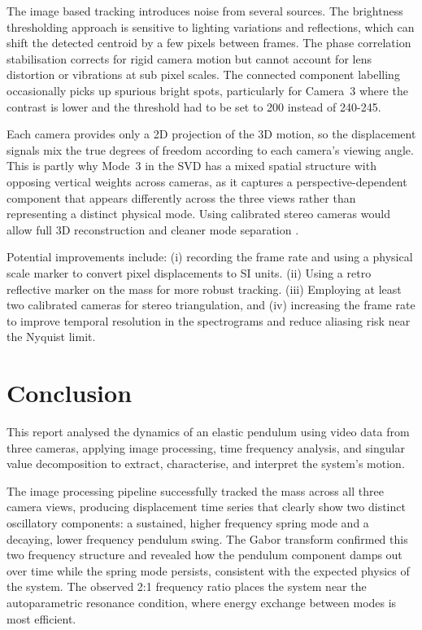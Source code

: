 \documentclass[12pt,a4paper]{article}
\begin{document}
The image based tracking introduces noise from several sources. The brightness thresholding approach is sensitive to lighting variations and reflections, which can shift the detected centroid by a few pixels between frames. The phase correlation stabilisation \citep{kuglin1975} corrects for rigid camera motion but cannot account for lens distortion or vibrations at sub pixel scales. The connected component labelling occasionally picks up spurious bright spots, particularly for Camera~3 where the contrast is lower and the threshold had to be set to 200 instead of 240-245.

Each camera provides only a 2D projection of the 3D motion, so the displacement signals mix the true degrees of freedom according to each camera's viewing angle. This is partly why Mode~3 in the SVD has a mixed spatial structure with opposing vertical weights across cameras, as it captures a perspective-dependent component that appears differently across the three views rather than representing a distinct physical mode. Using calibrated stereo cameras would allow full 3D reconstruction and cleaner mode separation \citep{hartley2003}.

Potential improvements include: (i) recording the frame rate and using a physical scale marker to convert pixel displacements to SI units. (ii) Using a retro reflective marker on the mass for more robust tracking. (iii) Employing at least two calibrated cameras for stereo triangulation, and (iv) increasing the frame rate to improve temporal resolution in the spectrograms and reduce aliasing risk near the Nyquist limit.

\section{Conclusion}

This report analysed the dynamics of an elastic pendulum using video data from three cameras, applying image processing, time frequency analysis, and singular value decomposition to extract, characterise, and interpret the system's motion.

The image processing pipeline successfully tracked the mass across all three camera views, producing displacement time series that clearly show two distinct oscillatory components: a sustained, higher frequency spring mode and a decaying, lower frequency pendulum swing. The Gabor transform confirmed this two frequency structure and revealed how the pendulum component damps out over time while the spring mode persists, consistent with the expected physics of the system. The observed 2:1 frequency ratio places the system near the autoparametric resonance condition, where energy exchange between modes is most efficient.
\end{document}
